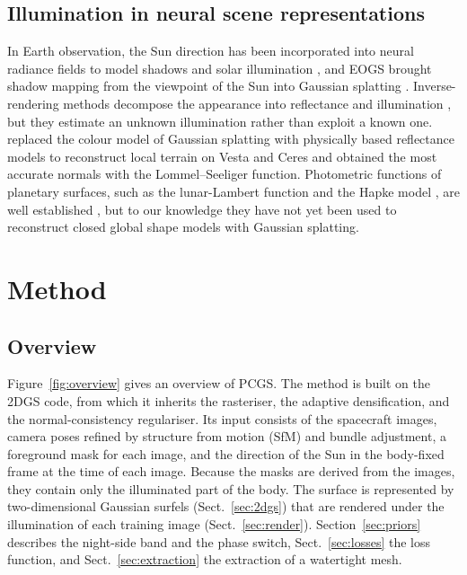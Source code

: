 \documentclass[fleqn,usenatbib]{aa}
\newcommand{\pcgs}{PCGS}
\begin{document}
\subsection{Illumination in neural scene representations}

In Earth observation, the Sun direction has been incorporated into neural radiance fields to model shadows and solar
illumination \citep{Derksen2021,Mari2022,Mari2023}, and EOGS brought shadow mapping from the viewpoint of the Sun into
Gaussian splatting \citep{SavantAira2025}. Inverse-rendering methods decompose the appearance into reflectance and
illumination \citep{Zhang2021NeRFactor,Liang2024GSIR,Jiang2024GaussianShader,Gao2024Relightable}, but they estimate an
unknown illumination rather than exploit a known one. \citet{Nolan2026} replaced the colour model of Gaussian
splatting with physically based reflectance models to reconstruct local terrain on Vesta and Ceres and obtained the
most accurate normals with the Lommel--Seeliger function. Photometric functions of planetary surfaces, such as the
lunar-Lambert function \citep{McEwen1991} and the Hapke model \citep{Hapke2012}, are well established \citep{Li2015},
but to our knowledge they have not yet been used to reconstruct closed global shape models with Gaussian splatting.

\section{Method}
\label{sec:method}

\subsection{Overview}

Figure~\ref{fig:overview} gives an overview of \pcgs. The method is built on the 2DGS code, from which it inherits the
rasteriser, the adaptive densification, and the normal-consistency regulariser. Its input consists of the spacecraft
images, camera poses refined by structure from motion (SfM) and bundle adjustment, a foreground mask for each image,
and the direction of the Sun in the body-fixed frame at the time of each image. Because the masks are derived from the
images, they contain only the illuminated part of the body. The surface is represented by two-dimensional Gaussian
surfels (Sect.~\ref{sec:2dgs}) that are rendered under the illumination of each training image
(Sect.~\ref{sec:render}). Section~\ref{sec:priors} describes the night-side band and the phase switch,
Sect.~\ref{sec:losses} the loss function, and Sect.~\ref{sec:extraction} the extraction of a watertight mesh.
\end{document}
